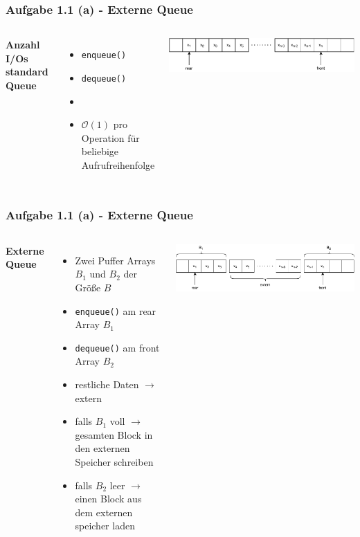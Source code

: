 \documentclass[aspectratio=169]{beamer}
\begin{document}
\begin{frame}
\frametitle{Aufgabe 1.1 (a) - Externe Queue}
\begin{columns}[c] %
	
	\textbf{Anzahl I/Os standard Queue}
	\begin{itemize}
		\item \texttt{enqueue()}
		\item \texttt{dequeue()}
		\item[]
		\item \textbf{$\mathcal{O}(1)$} pro Operation für beliebige Aufrufreihenfolge 
	\end{itemize}
	
	\includegraphics[scale=.5]{queue0.pdf}
	
\end{columns}
\end{frame}




\begin{frame}
	\frametitle{Aufgabe 1.1 (a) - Externe Queue}
	\begin{columns}[c] %
	
	\textbf{Externe Queue}
	\begin{itemize}
		\item Zwei Puffer Arrays $B_1$ und $B_2$ der Größe $B$
		\item \texttt{enqueue()} am rear Array $B_1$
		\item \texttt{dequeue()} am front Array $B_2$
		\item restliche Daten $\rightarrow$ extern
		\item falls $B_1$ voll $\rightarrow$ gesamten Block in den externen Speicher schreiben
		\item falls $B_2$ leer $\rightarrow$ einen Block aus dem externen speicher laden
	\end{itemize}
	
	\includegraphics[scale=.5]{queue1.pdf}
	
	\end{columns}
	\end{frame}
\end{document}
